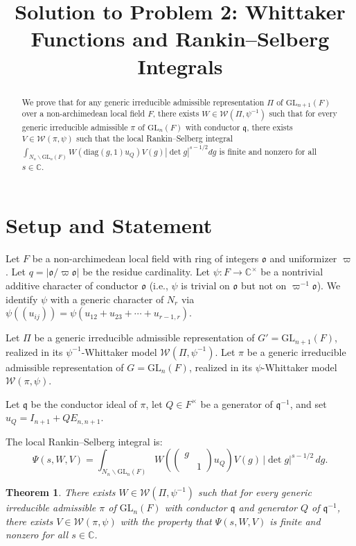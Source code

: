 \documentclass[12pt]{article}
\title{Solution to Problem 2: Whittaker Functions and Rankin--Selberg Integrals}
\author{}
\date{}
\newtheorem{theorem}{Theorem}
\theoremstyle{definition}
\begin{document}
\maketitle

\begin{abstract}
We prove that for any generic irreducible admissible representation $\Pi$ of $\mathrm{GL}_{n+1}(F)$ over a non-archimedean local field $F$, there exists $W \in \mathcal{W}(\Pi, \psi^{-1})$ such that for every generic irreducible admissible $\pi$ of $\mathrm{GL}_n(F)$ with conductor $\mathfrak{q}$, there exists $V \in \mathcal{W}(\pi, \psi)$ such that the local Rankin--Selberg integral $\int_{N_n\backslash\mathrm{GL}_n(F)} W(\mathrm{diag}(g,1)u_Q)V(g)|\det g|^{s-1/2}dg$ is finite and nonzero for all $s \in \mathbb{C}$.
\end{abstract}

\section{Setup and Statement}

Let $F$ be a non-archimedean local field with ring of integers $\mathfrak{o}$ and uniformizer $\varpi$. Let $q = |\mathfrak{o}/\varpi\mathfrak{o}|$ be the residue cardinality. Let $\psi\colon F \to \mathbb{C}^\times$ be a nontrivial additive character of conductor $\mathfrak{o}$ (i.e., $\psi$ is trivial on $\mathfrak{o}$ but not on $\varpi^{-1}\mathfrak{o}$). We identify $\psi$ with a generic character of $N_r$ via $\psi((u_{ij})) = \psi(u_{12}+u_{23}+\cdots+u_{r-1,r})$.

Let $\Pi$ be a generic irreducible admissible representation of $G' = \mathrm{GL}_{n+1}(F)$, realized in its $\psi^{-1}$-Whittaker model $\mathcal{W}(\Pi,\psi^{-1})$. Let $\pi$ be a generic irreducible admissible representation of $G = \mathrm{GL}_n(F)$, realized in its $\psi$-Whittaker model $\mathcal{W}(\pi,\psi)$.

Let $\mathfrak{q}$ be the conductor ideal of $\pi$, let $Q \in F^\times$ be a generator of $\mathfrak{q}^{-1}$, and set $u_Q = I_{n+1} + Q E_{n,n+1}$.

The local Rankin--Selberg integral is:
$$\Psi(s, W, V) = \int_{N_n\backslash\mathrm{GL}_n(F)} W\!\left(\begin{pmatrix} g & \\ & 1\end{pmatrix} u_Q\right) V(g)\, |\det g|^{s-1/2}\, dg.$$

\begin{theorem}\label{thm:main}
There exists $W \in \mathcal{W}(\Pi,\psi^{-1})$ such that for every generic irreducible admissible $\pi$ of $\mathrm{GL}_n(F)$ with conductor $\mathfrak{q}$ and generator $Q$ of $\mathfrak{q}^{-1}$, there exists $V \in \mathcal{W}(\pi,\psi)$ with the property that $\Psi(s,W,V)$ is finite and nonzero for all $s \in \mathbb{C}$.
\end{theorem}
\end{document}
